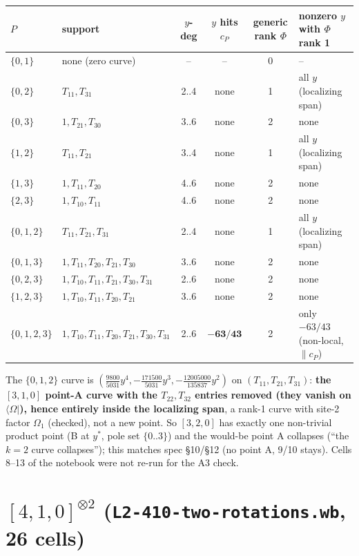 \documentclass[11pt]{article}
\newcommand{\bra}[1]{\langle #1|}
\newcommand{\Om}{\Omega}
\newcommand{\Tt}[1]{T_{#1}}
\newcommand{\nb}[1]{\texttt{#1}}
\begin{document}
\begin{center}\small
\begin{tabular}{@{}llcccl@{}}\toprule
$P$ & support & $y$-deg & $y$ hits $c_P$ & generic rank $\Phi$ & nonzero $y$ with $\Phi$ rank 1\\\midrule
$\{0,1\}$ & none (zero curve) & -- & -- & 0 & --\\
$\{0,2\}$ & $\Tt{11},\Tt{31}$ & 2..4 & none & 1 & all $y$ (localizing span)\\
$\{0,3\}$ & $1,\Tt{21},\Tt{30}$ & 3..6 & none & 2 & none\\
$\{1,2\}$ & $\Tt{11},\Tt{21}$ & 3..4 & none & 1 & all $y$ (localizing span)\\
$\{1,3\}$ & $1,\Tt{11},\Tt{20}$ & 4..6 & none & 2 & none\\
$\{2,3\}$ & $1,\Tt{10},\Tt{11}$ & 4..6 & none & 2 & none\\
$\{0,1,2\}$ & $\Tt{11},\Tt{21},\Tt{31}$ & 2..4 & none & 1 & all $y$ (localizing span)\\
$\{0,1,3\}$ & $1,\Tt{11},\Tt{20},\Tt{21},\Tt{30}$ & 3..6 & none & 2 & none\\
$\{0,2,3\}$ & $1,\Tt{10},\Tt{11},\Tt{21},\Tt{30},\Tt{31}$ & 2..6 & none & 2 & none\\
$\{1,2,3\}$ & $1,\Tt{10},\Tt{11},\Tt{20},\Tt{21}$ & 3..6 & none & 2 & none\\
$\{0,1,2,3\}$ & $1,\Tt{10},\Tt{11},\Tt{20},\Tt{21},\Tt{30},\Tt{31}$ & 2..6 & $\mathbf{-63/43}$ & 2 & only $-63/43$ (non-local, $\parallel c_P$)\\\bottomrule
\end{tabular}
\end{center}
The $\{0,1,2\}$ curve is $(\tfrac{9800}{5031}y^4,-\tfrac{171500}{5031}y^3,-\tfrac{12005000}{135837}y^2)$ on $(\Tt{11},\Tt{21},\Tt{31})$: \textbf{the $[3,1,0]$ point-A curve with the $\Tt{22},\Tt{32}$ entries removed (they vanish on $\bra\Om$), hence entirely inside the localizing span}, a rank-1 curve with site-2 factor $\Om_1$ (checked), not a new point. So $[3,2,0]$ has exactly one non-trivial product point (B at $y^*$, pole set $\{0..3\}$) and the would-be point A collapses (``the $k=2$ curve collapses''); this matches spec \S10/\S12 (no point A, 9/10 stays). Cells 8--13 of the notebook were not re-run for the A3 check.

\section{$[4,1,0]^{\otimes2}$ (\nb{L2-410-two-rotations.wb}, 26 cells)}\label{sec:410}
\end{document}
